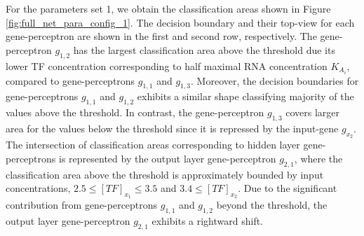 \documentclass[twocolumn]{biophys-new}
\begin{document}
{{%




For the parameters set 1, we obtain the classification areas shown in  Figure \ref{fig:full_net_para_config_1}.
The decision boundary and their top-view for each gene-perceptron are shown in the first  and second row, respectively. 
The gene-perceptron $g_{1,2}$ has the largest classification area above the threshold due its lower  TF concentration corresponding to half maximal RNA concentration $K_{A_i}$,  compared to  
 gene-perceptrons $g_{1,1}$ and $g_{1,3}$. Moreover, the decision boundaries for gene-perceptrons $g_{1,1}$ and $g_{1,2}$ exhibits a similar shape classifying majority of the values above the threshold. In contrast, the gene-perceptron $g_{1,3}$ covers larger area for the values below the threshold since it is repressed by the input-gene $g_{x_2}$. The intersection of classification areas corresponding to hidden layer gene-perceptrons is represented by the output layer gene-perceptron $g_{2,1}$, where the classification area above the threshold is approximately bounded by input concentrations, $2.5 \leq [TF]_{x_1} \leq 3.5$ and $3.4 \leq [TF]_{x_2}$. Due to the significant contribution from gene-perceptrons $g_{1,1}$ and $g_{1,2}$ beyond the threshold, the output layer gene-perceptron $g_{2,1}$ exhibits a rightward shift. %

}}
\end{document}
